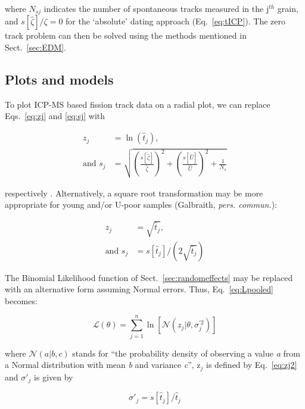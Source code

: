 \documentclass{article}
\begin{document}
where $N_{sj}$ indicates the number of spontaneous tracks measured in
the j$^{th}$ grain, and $s[\hat{\zeta}]/\zeta=0$ for the `absolute'
dating approach (Eq.~\ref{eq:tICP}). The zero track problem can then
be solved using the methods mentioned in Sect.~\ref{sec:EDM}.

\subsection{Plots and models}

To plot ICP-MS based fission track data on a radial plot, we can
replace Eqs.~\ref{eq:zj} and \ref{eq:sj} with

\begin{align}
  z_j & = \ln (\hat{t}_j) \mbox{,}   \label{eq:zj2} \\
  \mbox{and~} s_j & = \sqrt{ 
    \left(\frac{s[\hat{\zeta}]}{\hat{\zeta}}\right)^2 +
    \left(\frac{s[\hat{U}]}{\hat{U}}\right)^2 +
    \frac{1}{N_s}
  }   \label{eq:sj2}
\end{align}

respectively \citep{galbraith2010b}. Alternatively, a square root
transformation may be more appropriate for young and/or U-poor samples
(Galbraith, \textit{pers. commun.}):

\begin{align}
  z_j & = \sqrt{\hat{t}_j} \mbox{,}   \label{eq:zj3} \\
  \mbox{and~} s_j & = s[\hat{t}_j]\bigg/\left(2\sqrt{\hat{t}_j}\right)
  \label{eq:sj3}
\end{align}

The Binomial Likelihood function of
Sect.~\ref{sec:randomeffects} may be replaced with an alternative form
assuming Normal errors. Thus, Eq.~\ref{eq:Lpooled} becomes:

\begin{equation}
\mathcal{L}(\theta) = \sum\limits_{j=1}^{n}
\ln \left[ \mathcal{N}(z_j|\theta,\sigma_j^{\prime 2}) \right]
\label{eq:Lpoolednorm}
\end{equation}

where $\mathcal{N}(a|b,c)$ stands for ``the probability density of
observing a value \emph{a} from a Normal distribution with mean
\emph{b} and variance \emph{c}'', z$_j$ is defined by Eq.~\ref{eq:zj2}
and $\sigma'_j$ is given by

\begin{equation}
\sigma'_j = s[\hat{t}_j]/\hat{t}_j
\end{equation}
\end{document}
